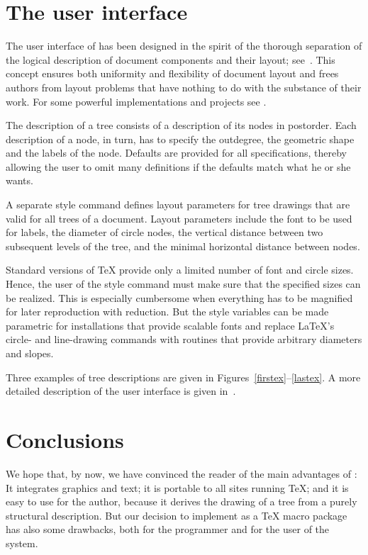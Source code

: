 \section{The user interface}\label{Interface}

The user interface of \TreeTeX{} has been designed in the spirit of
the thorough separation of the logical description of document components
and their layout; see~\cite{DocumentFormatting,GML}. This concept
ensures both uniformity and flexibility of document layout and frees
authors from layout problems that have nothing to do with the
substance of their work. For some powerful implementations and projects
see \cite{Tables,Karlsruhe,LaTeX,Grif,Scribe}.

The description of a tree consists of a description of its nodes
in postorder. Each description of a node, in turn, has to specify
the outdegree, the geometric shape and the labels of the node.
Defaults are provided for all specifications,
thereby allowing the user to omit many definitions
if the defaults match what he or she wants.

A separate style command defines layout parameters for tree drawings
that are valid for all trees of a document.
Layout parameters include the font to be used for labels, the diameter
of circle nodes, the vertical distance between two subsequent levels
of the tree, and the minimal horizontal distance between nodes.

Standard versions of \TeX{} provide only a limited number of
font and circle sizes. Hence, the user of the style command must make
sure that the specified sizes can be realized. This is especially
cumbersome when everything has to be magnified for later reproduction
with reduction. But the style variables can be made parametric for
installations that provide scalable fonts and replace \LaTeX{}'s
circle- and line-drawing commands with routines that provide arbitrary
diameters and slopes.

Three examples of tree descriptions are given in 
Figures~\ref{firstex}--\ref{lastex}.
A more detailed description of the user interface is 
given in~\cite{Exeter}.

\section{Conclusions}

We hope that, by now, we have convinced the reader of the main advantages
of \TreeTeX{}: It integrates graphics and text; it is portable to all
sites running \TeX{}; 
and it is easy to use for the author, because it derives the drawing 
of a tree from a purely structural description. But our decision to
implement \TreeTeX{} as a \TeX{} macro package has also some
drawbacks, both for the programmer and for the user of the system.

